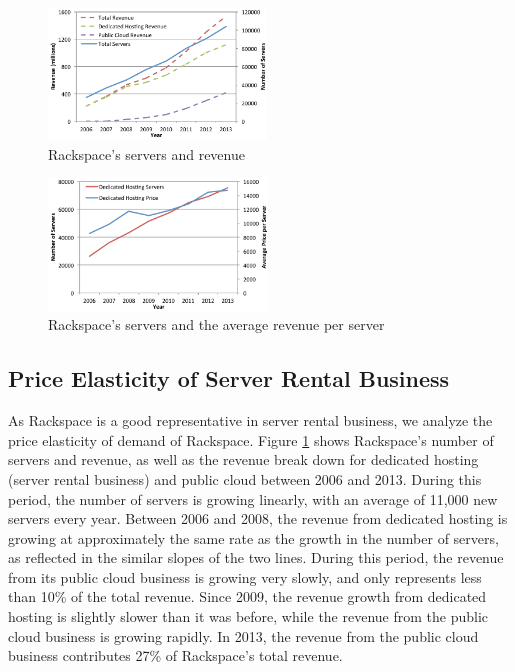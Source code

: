\documentclass[10pt,journal,cspaper,compsoc]{IEEEtran}
\begin{document}
\begin{figure}[t!]
\centering
\includegraphics[height=3.5cm]{fig04}
\caption{Rackspace's servers and revenue}
\label{fig:rackspaceNrevenue}
\end{figure}

\begin{figure}[t!]
\centering
\includegraphics[height=3.5cm]{fig05}
\caption{Rackspace's servers and the average revenue per server}
\label{fig:rackspaceNavgrevenue}
\end{figure}


\subsection{Price Elasticity of Server Rental Business}

As Rackspace is a good representative in server rental business, we analyze the price elasticity of demand of Rackspace.
Figure \ref{fig:rackspaceNrevenue} shows Rackspace's number of servers and revenue, as well as the revenue break down for dedicated hosting (server rental business) and public cloud between 2006 and 2013. During this period, the number of servers is growing linearly, with an average of 11,000 new servers every year. Between 2006 and 2008, the revenue from dedicated hosting is growing at approximately the same rate as the growth in the number of servers, as reflected in the similar slopes of the two lines.  During this period, the revenue from its public cloud business is growing very slowly, and only represents less than 10\% of the total revenue. Since 2009, the revenue growth from dedicated hosting is slightly slower than it was before, while the revenue from the public cloud business is growing rapidly. In 2013, the revenue from the public cloud business contributes 27\% of Rackspace's total revenue.
\end{document}
